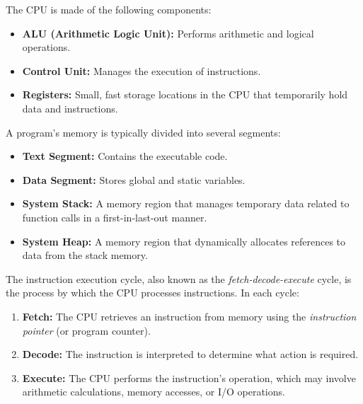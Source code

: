 \begin{Def}
    
    The CPU is made of the following components:
    \begin{itemize}
        \item \textbf{ALU (Arithmetic Logic Unit):} Performs arithmetic and logical operations.
        \item \textbf{Control Unit:} Manages the execution of instructions.
        \item \textbf{Registers:} Small, fast storage locations in the CPU that temporarily hold data and instructions.
    \end{itemize}
\end{Def}

\newpage

\begin{Def}

    A program's memory is typically divided into several segments:
\begin{itemize}
    \item \textbf{Text Segment:} Contains the executable code.
    \item \textbf{Data Segment:} Stores global and static variables.
    \item \textbf{System Stack:} A memory region that manages temporary data related to function calls in a first-in-last-out manner.
    \item \textbf{System Heap:} A memory region that dynamically allocates references to data from the stack memory. 
\end{itemize}
\end{Def}

\begin{Def}

    The instruction execution cycle, also known as the \emph{fetch-decode-execute} cycle, is the process by which the CPU processes instructions. In each cycle:
\begin{enumerate}
    \item \textbf{Fetch:} The CPU retrieves an instruction from memory using the \emph{instruction pointer} (or program counter).
    \item \textbf{Decode:} The instruction is interpreted to determine what action is required.
    \item \textbf{Execute:} The CPU performs the instruction's operation, which may involve arithmetic calculations, memory accesses, or I/O operations.
\end{enumerate}
\end{Def}

